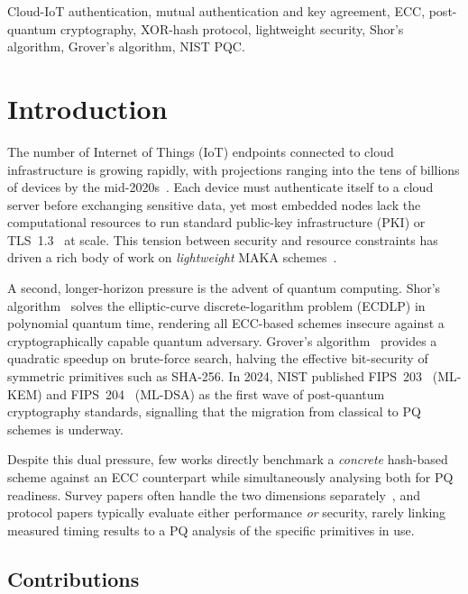 \documentclass[journal]{IEEEtran}
\begin{document}
\begin{IEEEkeywords}
Cloud-IoT authentication, mutual authentication and key agreement, ECC,
post-quantum cryptography, XOR-hash protocol, lightweight security,
Shor's algorithm, Grover's algorithm, NIST PQC.
\end{IEEEkeywords}

\section{Introduction}
\label{sec:intro}

The number of Internet of Things (IoT) endpoints connected to cloud
infrastructure is growing rapidly, with projections ranging into the tens of
billions of devices by the mid-2020s~\cite{Xuetal2022,Alrawaisetal2017}.
Each device must authenticate itself to a cloud server before exchanging
sensitive data, yet most embedded nodes lack the computational resources to
run standard public-key infrastructure (PKI) or TLS~1.3~\cite{RFC8446}
at scale. This tension between security and resource constraints has driven a
rich body of work on \emph{lightweight} MAKA
schemes~\cite{Turkanovicetal2014,AminBiswas2016,Dasetal2018,Challaetal2018}.

A second, longer-horizon pressure is the advent of quantum computing. Shor's
algorithm~\cite{Shor1997} solves the elliptic-curve discrete-logarithm
problem (ECDLP) in polynomial quantum time, rendering all ECC-based
schemes insecure against a cryptographically capable quantum adversary.
Grover's algorithm~\cite{Grover1996} provides a quadratic speedup on
brute-force search, halving the effective bit-security of symmetric
primitives such as SHA-256. In 2024, NIST published FIPS~203~\cite{NISTFIPS203}
(ML-KEM) and FIPS~204~\cite{NISTFIPS204} (ML-DSA) as the first wave of
post-quantum cryptography standards, signalling that the migration from
classical to PQ schemes is underway.

Despite this dual pressure, few works directly benchmark a \emph{concrete}
hash-based scheme against an ECC counterpart while simultaneously analysing
both for PQ readiness. Survey papers often handle the two dimensions
separately~\cite{Bernstein2017,Fernandezetal2023}, and protocol papers
typically evaluate either performance \emph{or} security, rarely linking
measured timing results to a PQ analysis of the specific primitives in use.

\subsection*{Contributions}
\end{document}
